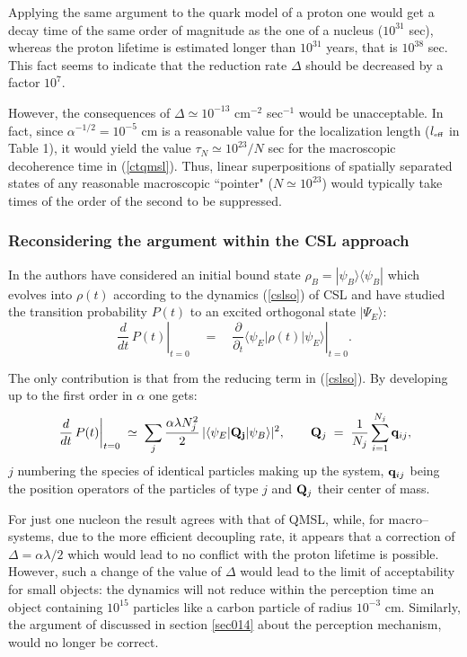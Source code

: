 \documentclass[12pt]{article}
\begin{document}
Applying the same argument to the quark model of a proton one would
get a decay time of the same order of magnitude as the one of a
nucleus ($10^{31}$ sec), whereas the proton lifetime is estimated
longer than $10^{31}$ years, that is $10^{38}$ sec.
This fact seems to indicate that the reduction rate $\Delta$
should be decreased by a factor $10^{7}$.

However, the consequences of $\Delta \simeq 10^{-13}$ cm$^{-2}$
sec$^{-1}$ would be unacceptable. In fact, since $\alpha^{-1/2} =
10^{-5}$ cm is a reasonable value for the localization length
($l_{\makebox{\tiny eff}}$ in Table 1), it would yield the value
$\tau_{N} \simeq 10^{23}/N$ sec for the macroscopic decoherence
time in (\ref{ctqmsl}). Thus, linear superpositions of spatially
separated states of any reasonable macroscopic ``pointer" ($N
\simeq 10^{23}$) would typically take times of the order of the
second to be suppressed.

\subsubsection{Reconsidering the argument within the CSL approach}
\label{sec1531}

In \cite{pes} the authors have considered an initial bound state
$\rho_{B} = |\psi_{B}\rangle\langle\psi_{B}|$ which evolves into
$\rho(t)$ according to the dynamics (\ref{cslso}) of CSL and have
studied the transition probability $P(t)$ to an excited orthogonal
state $|\Psi_{E}\rangle$:
\begin{equation}
\left.\frac{d}{dt}\, P(t)\right|_{t = 0} \quad = \quad \left.
\frac{\partial}{\partial_{t}} \langle \psi_{E} | \rho(t)
|\psi_{E}\rangle \right|_{t = 0}.
\end{equation}

The only contribution is that from the reducing term in
(\ref{cslso}). By developing up to the first order in $\alpha$ one gets:
\begin{equation} \label{davs}
\left. \frac{d}{dt}\, P(t) \right|_{t = 0} \; \simeq \; \sum_{j}
\frac{\alpha\lambda N_{j}^{2}}{2}\, |\langle \psi_{E} | {\bf
Q_{j}} | \psi_{B} \rangle |^{2}, \qquad {\bf Q}_{j} \;  = \;
\frac{1}{N_{j}} \sum_{i = 1}^{N_{j}} {\bf q}_{ij},
\end{equation}
$j$ numbering the species of identical particles making up the
system, ${\bf q}_{ij}$ being the position operators of the  particles of
type $j$ and ${\bf Q}_{j}$ their center of mass.

For just one nucleon the result agrees with that of QMSL, while,
for macro--systems, due to the more efficient decoupling rate, it
appears that a correction of $\Delta = \alpha\lambda/2$ which
would lead to no conflict with the proton lifetime is possible.
However, such a change of the value of $\Delta$ would lead  to
the limit of acceptability for small objects: the dynamics will
not reduce within the perception time an object containing
$10^{15}$ particles like a carbon particle of radius $10^{-3}$ cm.
Similarly, the argument of \cite{abp} discussed in section
\ref{sec014} about the perception mechanism, would no longer be
correct.
\end{document}
